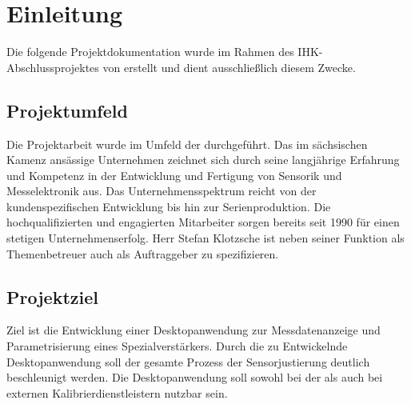 \section{Einleitung}
Die folgende Projektdokumentation wurde im Rahmen des IHK-Abschlussprojektes von \aName erstellt und dient ausschließlich diesem Zwecke. 

\subsection{Projektumfeld}
Die Projektarbeit wurde im Umfeld der \bName durchgeführt. Das im sächsischen Kamenz ansässige Unternehmen zeichnet sich durch seine langjährige Erfahrung und Kompetenz in der Entwicklung und Fertigung von Sensorik und Messelektronik aus. Das Unternehmensspektrum reicht von der kundenspezifischen Entwicklung bis hin zur Serienproduktion. Die hochqualifizierten und engagierten Mitarbeiter sorgen bereits seit 1990 für einen stetigen Unternehmenserfolg. Herr Stefan Klotzsche ist neben seiner Funktion als Themenbetreuer auch als Auftraggeber zu spezifizieren.

\subsection{Projektziel}
Ziel ist die Entwicklung einer Desktopanwendung zur Messdatenanzeige und Parametrisierung eines Spezialverstärkers. Durch die zu Entwickelnde Desktopanwendung soll der gesamte Prozess der Sensorjustierung deutlich beschleunigt werden. Die Desktopanwendung soll sowohl bei der \bName als auch bei externen Kalibrierdienstleistern nutzbar sein.